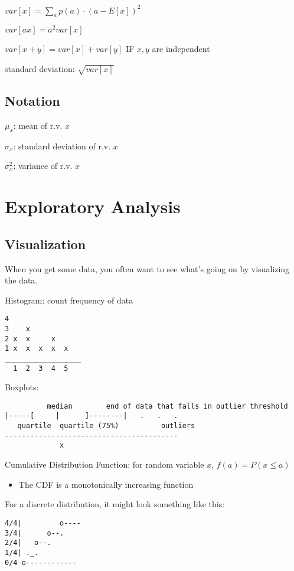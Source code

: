 \documentclass[twoside]{article}
\begin{document}
$var[x] = \sum\limits_a p(a) \cdot (a - E[x])^2$

$var[ax] = a^2 var[x]$

$var[x+y] = var[x] + var[y]$ IF $x,y$ are independent

standard deviation: $\sqrt{var[x]}$

\subsection{Notation}

$\mu_x$: mean of r.v. $x$

$\sigma_x$: standard deviation of r.v. $x$

$\sigma_x^2$: variance of r.v. $x$ 

\section{Exploratory Analysis}

\subsection{Visualization}
When you get some data, you often want to see what's going on by visualizing the data.

Histogram: count frequency of data

\begin{verbatim}
4
3    x
2 x  x     x
1 x  x  x  x  x
__________________
  1  2  3  4  5
\end{verbatim}

Boxplots: 

\begin{verbatim}
          median        end of data that falls in outlier threshold   
|-----[     |      ]--------|   .   .   .
   quartile  quartile (75%)          outliers
-----------------------------------------
             x 
\end{verbatim}

Cumulative Distribution Function: for random variable $x$, $f(a) = P(x \leq a )$

\begin{itemize}
\item The CDF is a monotonically increasing function
\end{itemize}

For a discrete distribution, it might look something like this:

\begin{verbatim}
4/4|         o----
3/4|      o--.
2/4|   o--.
1/4| ._.
0/4 o------------
\end{verbatim}
\end{document}
